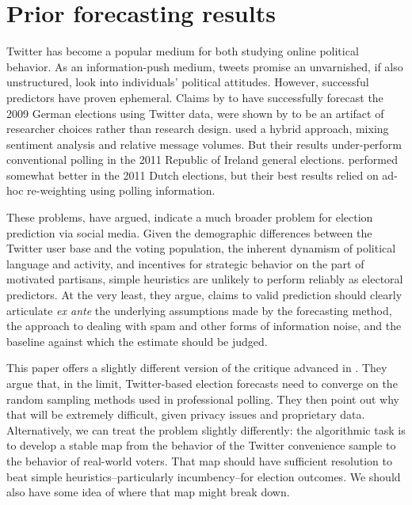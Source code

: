 \documentclass{article}
\begin{document}

\section{Prior forecasting results}
\label{sec:prior-forec-results}

Twitter has become a popular medium for both studying online political
behavior. As an information-push medium,
tweets promise an unvarnished, if also unstructured, look into
individuals' political attitudes. However, successful predictors have
proven ephemeral. Claims by \cite{tumasjan2010election} to have
successfully forecast the 2009 German elections using Twitter
data, were shown by \cite{jungherr2012pirate} to be an artifact of
researcher choices rather than research
design. \cite{bermingham2011using} used a hybrid approach, mixing
sentiment analysis and relative message volumes. But their results
under-perform conventional polling in the 2011 Republic of Ireland
general elections. \cite{sang2012predicting} performed somewhat better
in the 2011 Dutch elections, but their best results relied on ad-hoc
re-weighting using polling information. 

These problems, \cite{metaxas2011not} have argued, indicate a much
broader problem for election prediction via social media. Given the
demographic differences between the Twitter user base and the voting
population, the inherent dynamism of political language and activity,
and incentives for strategic behavior on the part of motivated
partisans, simple heuristics are unlikely to perform reliably as
electoral predictors. At the very least, they argue, claims to valid
prediction should clearly articulate \textit{ex ante} the underlying
assumptions made by the forecasting method, the approach to dealing
with spam and other forms of information noise, and the baseline
against which the estimate should be judged. 

This paper offers a slightly different version of the critique
advanced in \cite{metaxas2011not}. They argue that, in the limit,
Twitter-based election forecasts need to converge on the random
sampling methods used in professional polling. They then point out why
that will be extremely difficult, given privacy issues and proprietary
data. Alternatively, we can treat the problem slightly differently:
the algorithmic task is to develop a stable map from the behavior of
the Twitter convenience sample to the behavior of real-world
voters. That map should have sufficient resolution to beat simple
heuristics--particularly incumbency--for election outcomes. We should
also have some idea of where that map might break down. 
\end{document}
